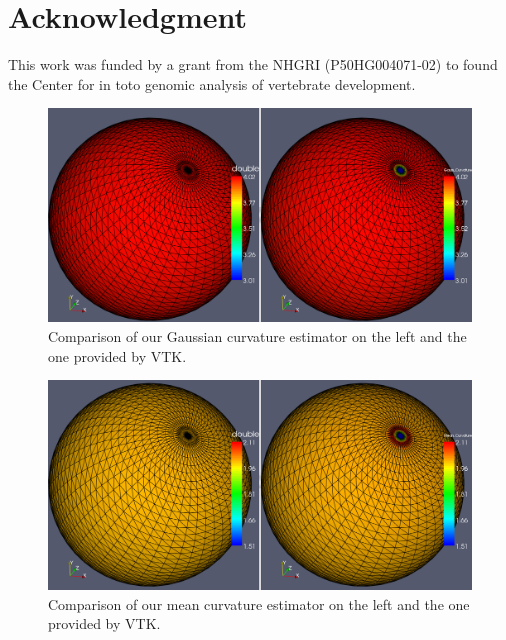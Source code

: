 \documentclass{InsightArticle}
\theoremstyle{plain}
\begin{document}
\section*{Acknowledgment}
This work was funded by a grant from the NHGRI (P50HG004071-02) to found the Center for in toto genomic analysis of vertebrate development.

%
%




\begin{figure}[tb]
  \centering
  \includegraphics[height=0.2\textheight]{sphere_gauss_curvature_compare}
  \caption{Comparison of our Gaussian curvature estimator on the left and the one provided by VTK.}
  \label{fig:sphere_gauss_comparison}
\end{figure}

\begin{figure}[htbp]
  \centering
  \includegraphics[height=0.2\textheight]{sphere_mean_curvature_compare}
  \caption{Comparison of our mean curvature estimator on the left and the one provided by VTK.}
  \label{fig:sphere_mean_comparison}
\end{figure}
\end{document}
